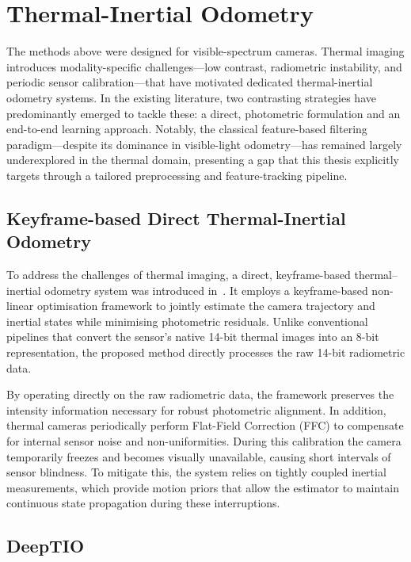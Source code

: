 \section{Thermal-Inertial Odometry}
\label{sec:rw_thermal}
The methods above were designed for visible-spectrum cameras. Thermal imaging introduces modality-specific challenges---low contrast, radiometric instability, and periodic sensor calibration---that have motivated dedicated thermal-inertial odometry systems. In the existing literature, two contrasting strategies have predominantly emerged to tackle these: a direct, photometric formulation and an end-to-end learning approach. Notably, the classical feature-based filtering paradigm---despite its dominance in visible-light odometry---has remained largely underexplored in the thermal domain, presenting a gap that this thesis explicitly targets through a tailored preprocessing and feature-tracking pipeline.

\subsection{Keyframe-based Direct Thermal-Inertial Odometry}
To address the challenges of thermal imaging, a direct, keyframe-based thermal–inertial odometry system was introduced in~\cite{Khattak_2019}. It employs a keyframe-based non-linear optimisation framework to jointly estimate the camera trajectory and inertial states while minimising photometric residuals. Unlike conventional pipelines that convert the sensor's native 14-bit thermal images into an 8-bit representation, the proposed method directly processes the raw 14-bit radiometric data.

By operating directly on the raw radiometric data, the framework preserves the intensity information necessary for robust photometric alignment. In addition, thermal cameras periodically perform Flat-Field Correction (FFC) to compensate for internal sensor noise and non-uniformities. During this calibration the camera temporarily freezes and becomes visually unavailable, causing short intervals of sensor blindness. To mitigate this, the system relies on tightly coupled inertial measurements, which provide motion priors that allow the estimator to maintain continuous state propagation during these interruptions.

\subsection{DeepTIO}

